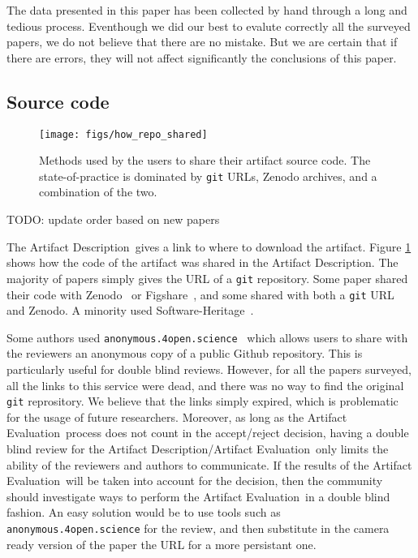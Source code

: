 \documentclass[sigconf,natbib=false]{acmart}
\newcommand{\ad}{Artifact Description}
\newcommand{\aeval}{Artifact Evaluation}
\newcommand{\adae}{\ad/\aeval}
\newcommand{\todo}[1]{{\color{red}TODO: #1}}
\begin{document}
The data presented in this paper has been collected by hand through a long and tedious process.
Eventhough we did our best to evalute correctly all the surveyed papers, we do not believe that there are no mistake.
But we are certain that if there are errors, they will not affect significantly the conclusions of this paper.

\subsection{Source code}\label{sec:sop:src}

\begin{figure}
  \centering
  \texttt{[image: figs/how\_repo\_shared]}
  \caption{Methods used by the users to share their artifact source code. The state-of-practice is dominated by \texttt{git} URLs, Zenodo archives, and a combination of the two.}\label{fig:how_repo_shared}
\end{figure}

\todo{update order based on new papers}

The \ad\ gives a link to where to download the artifact.
Figure \ref{fig:how_repo_shared} shows how the code of the artifact was shared in the \ad.
The majority of papers simply gives the URL of a \texttt{git} repository.
Some paper shared their code with Zenodo\ \cite{zenodo} or Figshare\ \cite{figshare}, and some shared with both a \texttt{git} URL and Zenodo.
A minority used Software-Heritage\ \cite{swheritage}.

Some authors used \texttt{anonymous.4open.science}\ \cite{anonymous_github} which allows users to share with the reviewers an anonymous copy of a public Github repository.
This is particularly useful for double blind reviews.
However, for all the papers surveyed, all the links to this service were dead, and there was no way to find the original \texttt{git} reprository.
We believe that the links simply expired, which is problematic for the usage of future researchers.
Moreover, as long as the \aeval\ process does not count in the accept/reject decision, having a double blind review for the \adae\ only limits the ability of the reviewers and authors to communicate.
If the results of the \aeval\ will be taken into account for the decision, then the community should investigate ways to perform the \aeval\ in a double blind fashion.
An easy solution would be to use tools such as \texttt{anonymous.4open.science} for the review, and then substitute in the camera ready version of the paper the URL for a more persistant one.
\end{document}
